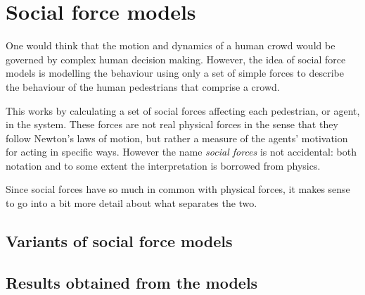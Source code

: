 \section{Social force models}
\label{sec:social-forces}
One would think that the motion and dynamics of a human crowd would be 
governed by complex human decision making. However, the idea of social force 
models is modelling the behaviour using only a set of simple forces to 
describe the behaviour of the human pedestrians that comprise a crowd.

This works by calculating a set of social forces affecting each pedestrian, or 
agent, in the system. These forces are not real physical forces in the sense 
that they follow Newton's laws of motion, but rather a measure of the agents' 
motivation for acting in specific ways. However the name \emph{social forces} 
is not accidental: both notation and to some extent the interpretation is 
borrowed from physics. 

Since social forces have so much in common with physical forces, it makes 
sense to go into a bit more detail about what separates the two.

\subsection{Variants of social force models}
\subsection{Results obtained from the models}



